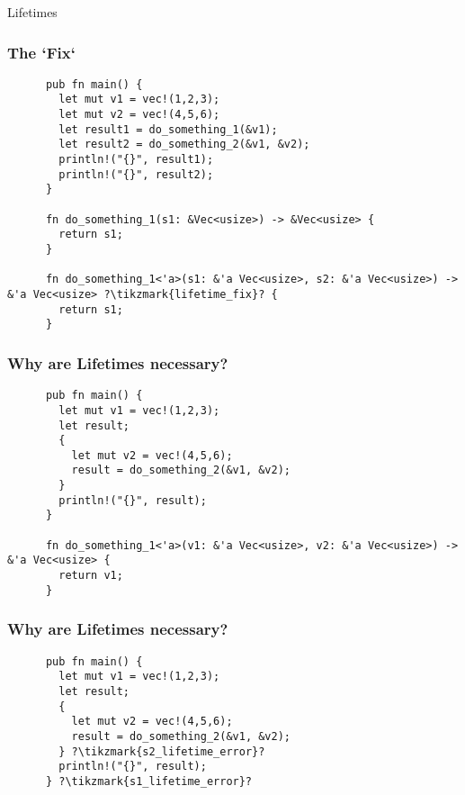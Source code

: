 \begin{section}{Lifetimes}
  \begin{frame}[fragile]
    \frametitle{The `Fix`}
    \begin{verbatim}
      pub fn main() {
        let mut v1 = vec!(1,2,3);
        let mut v2 = vec!(4,5,6);
        let result1 = do_something_1(&v1);
        let result2 = do_something_2(&v1, &v2);
        println!("{}", result1);
        println!("{}", result2);
      }

      fn do_something_1(s1: &Vec<usize>) -> &Vec<usize> {
        return s1;
      }

      fn do_something_1<'a>(s1: &'a Vec<usize>, s2: &'a Vec<usize>) -> &'a Vec<usize> ?\tikzmark{lifetime_fix}? {
        return s1;
      }
    \end{verbatim}
  \end{frame}

    \begin{frame}[fragile]
    \frametitle{Why are Lifetimes necessary? \cite{RustLang}}
    \begin{verbatim}
      pub fn main() {
        let mut v1 = vec!(1,2,3);
        let result;
        {
          let mut v2 = vec!(4,5,6);
          result = do_something_2(&v1, &v2);
        }
        println!("{}", result);
      }

      fn do_something_1<'a>(v1: &'a Vec<usize>, v2: &'a Vec<usize>) -> &'a Vec<usize> {
        return v1;
      }
    \end{verbatim}
  \end{frame}

  \begin{frame}[fragile]
    \frametitle{Why are Lifetimes necessary?}
    \begin{verbatim}
      pub fn main() {
        let mut v1 = vec!(1,2,3);
        let result;
        {
          let mut v2 = vec!(4,5,6);
          result = do_something_2(&v1, &v2);
        } ?\tikzmark{s2_lifetime_error}?
        println!("{}", result);
      } ?\tikzmark{s1_lifetime_error}?


\end{verbatim}
\end{frame}
\end{section}
